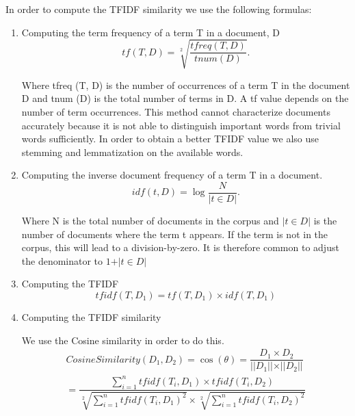 In order to compute the TFIDF similarity we use the following formulas:
\begin{enumerate}
	\item Computing the term frequency of a term T in a document, D 	
	\begin{equation}
	tf(T, D) = \sqrt[2]{\dfrac{tfreq(T, D)}{tnum(D)}}.
	\end{equation}

		Where tfreq (T, D) is the number of occurrences of a term T in the document D and tnum (D) is the total number of terms in D. A tf value depends on the number of term occurrences. This method cannot characterize documents accurately because it is not able to distinguish important words from trivial words sufficiently. In order to obtain a better TFIDF value we also use stemming and lemmatization on the available words. 
	\item Computing the inverse document frequency of a term T in a document.
	\begin{equation}
	idf(t, D) = \log{\dfrac{N}{\vert t \in D \vert}}.
	\end{equation}

		Where N is the total number of documents in the corpus and $\vert{t \in D }\vert$ is the number of documents where the term t appears. If the term is not in the corpus, this will lead to a division-by-zero. It is therefore common to adjust the denominator to $1 + \vert{t \in D}\vert$

	\item Computing the TFIDF \cite{hybrid-recomm}
	\begin{equation}
		tfidf (T, D_{1}) = tf (T, D_{1}) \times idf(T,D_{1})
	\end{equation}
	\item Computing the TFIDF similarity

		We use the Cosine similarity in order to do this.
		\begin{equation}
			\begin{split}
				Cosine Similarity(D_{1},D_{2}) = \cos (\theta) = \dfrac{D_{1} \times D_{2}}{\vert\vert D_{1} \vert\vert \times  \vert\vert D_{2} \vert\vert}\\
				= \dfrac {\sum_{i=1}^{n} tfidf(T_{i}, D_{1}) \times tfidf(T_{i}, D_{2})} {\sqrt[2]{\sum_{i=1}^{n} tfidf(T_{i},D_{1} )^{2}} \times \sqrt[2]{\sum_{i=1}^{n} tfidf(T_{i},D_{2} )^{2}}} 
			\end{split}
		\end{equation}
		

\end{enumerate}
